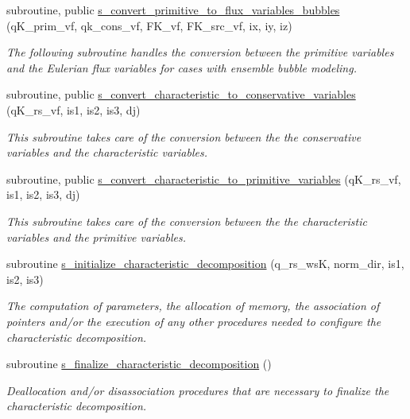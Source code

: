\begin{DoxyCompactItemize}
subroutine, public \hyperlink{namespacem__variables__conversion_ac02f08709876d8ef71c8f8db47a4efa3}{s\+\_\+convert\+\_\+primitive\+\_\+to\+\_\+flux\+\_\+variables\+\_\+bubbles} (q\+K\+\_\+prim\+\_\+vf, qk\+\_\+cons\+\_\+vf, F\+K\+\_\+vf, F\+K\+\_\+src\+\_\+vf, ix, iy, iz)
\begin{DoxyCompactList}\small\item\em The following subroutine handles the conversion between the primitive variables and the Eulerian flux variables for cases with ensemble bubble modeling. \end{DoxyCompactList}\item 
subroutine, public \hyperlink{namespacem__variables__conversion_a40712fcf8ac2c0e87d0393bbe1a0b800}{s\+\_\+convert\+\_\+characteristic\+\_\+to\+\_\+conservative\+\_\+variables} (q\+K\+\_\+rs\+\_\+vf, is1, is2, is3, dj)
\begin{DoxyCompactList}\small\item\em This subroutine takes care of the conversion between the the conservative variables and the characteristic variables. \end{DoxyCompactList}\item 
subroutine, public \hyperlink{namespacem__variables__conversion_a49df2e65b245cbc006e27663d69e4399}{s\+\_\+convert\+\_\+characteristic\+\_\+to\+\_\+primitive\+\_\+variables} (q\+K\+\_\+rs\+\_\+vf, is1, is2, is3, dj)
\begin{DoxyCompactList}\small\item\em This subroutine takes care of the conversion between the the characteristic variables and the primitive variables. \end{DoxyCompactList}\item 
subroutine \hyperlink{namespacem__variables__conversion_a3ca1b002fc78b7faad2f8638e4a42f9a}{s\+\_\+initialize\+\_\+characteristic\+\_\+decomposition} (q\+\_\+rs\+\_\+wsK, norm\+\_\+dir, is1, is2, is3)
\begin{DoxyCompactList}\small\item\em The computation of parameters, the allocation of memory, the association of pointers and/or the execution of any other procedures needed to configure the characteristic decomposition. \end{DoxyCompactList}\item 
subroutine \hyperlink{namespacem__variables__conversion_a81e6ad74f0a2bd1b27a7873dbd797a60}{s\+\_\+finalize\+\_\+characteristic\+\_\+decomposition} ()
\begin{DoxyCompactList}\small\item\em Deallocation and/or disassociation procedures that are necessary to finalize the characteristic decomposition. \end{DoxyCompactList}\item 

\end{DoxyCompactItemize}
